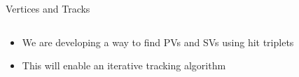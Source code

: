 \begin{frame}{Vertices and Tracks}
\begin{columns}[c]
  \end{columns}
  
  \begin{block}{}
  \begin{itemize}
      \item We are developing a way to find PVs and SVs using hit triplets
      \item This will enable an iterative tracking algorithm
  \end{itemize}
  \end{block}
\end{frame}
